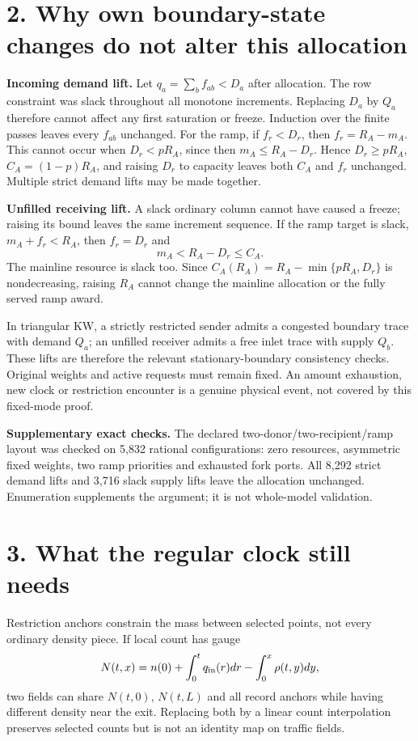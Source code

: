 \documentclass[11pt,a4paper]{article}
\begin{document}
\newpage
\section*{2. Why own boundary-state changes do not alter this allocation}
\textbf{Incoming demand lift.} Let $q_a=\sum_b f_{ab}<D_a$ after allocation.
The row constraint was slack throughout all monotone increments. Replacing
$D_a$ by $Q_a$ therefore cannot affect any first saturation or freeze.
Induction over the finite passes leaves every $f_{ab}$ unchanged.
For the ramp, if $f_r<D_r$, then $f_r=R_A-m_A$. This cannot occur when
$D_r<pR_A$, since then $m_A\le R_A-D_r$. Hence $D_r\ge pR_A$,
$C_A=(1-p)R_A$, and raising $D_r$ to capacity leaves both $C_A$ and
$f_r$ unchanged. Multiple strict demand lifts may be made together.

\textbf{Unfilled receiving lift.} A slack ordinary column cannot have caused
a freeze; raising its bound leaves the same increment sequence. If the ramp
target is slack, $m_A+f_r<R_A$, then $f_r=D_r$ and
\[
 m_A<R_A-D_r\le C_A.
\]
The mainline resource is slack too. Since
$C_A(R_A)=R_A-\min\{pR_A,D_r\}$ is nondecreasing, raising $R_A$ cannot
change the mainline allocation or the fully served ramp award.

In triangular KW, a strictly restricted sender admits a congested boundary
trace with demand $Q_a$; an unfilled receiver admits a free inlet trace with
supply $Q_b$. These lifts are therefore the relevant stationary-boundary
consistency checks. Original weights and active requests must remain fixed.
An amount exhaustion, new clock or restriction encounter is a genuine
physical event, not covered by this fixed-mode proof.

\textbf{Supplementary exact checks.} The declared two-donor/two-recipient/ramp
layout was checked on 5,832 rational configurations: zero resources,
asymmetric fixed weights, two ramp priorities and exhausted fork ports.
All 8,292 strict demand lifts and 3,716 slack supply lifts leave the allocation
unchanged. Enumeration supplements the argument; it is not whole-model validation.

\section*{3. What the regular clock still needs}
Restriction anchors constrain the mass between selected points, not every
ordinary density piece. If local count has gauge
\[
 N(t,x)=n(0)+\int_0^t q_{\rm in}(r)dr-\int_0^x\rho(t,y)dy,
\]
two fields can share $N(t,0)$, $N(t,L)$ and all record anchors while having
different density near the exit. Replacing both by a linear count interpolation
preserves selected counts but is not an identity map on traffic fields.
\end{document}
